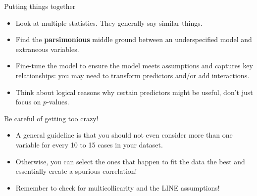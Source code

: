 \documentclass{beamer}\usepackage[]{graphicx}\usepackage[]{color}
\newenvironment{knitrout}{}{} %
\begin{document}
\begin{darkframes}
\begin{frame}[fragile]
      \vspace{-1in}

\begin{knitrout}


\end{knitrout}
    \end{frame}

    \begin{frame}{Putting things together}
      \begin{itemize}[<+->]
        \item Look at multiple statistics. They generally say similar things.
        \item Find the \textbf{parsimonious} middle ground between an underspecified model and extraneous variables.
        \item Fine-tune the model to ensure the model meets assumptions and captures key relationships: you may need to transform predictors and/or add interactions.
        \item Think about logical reasons why certain predictors might be useful, don't just focus on $p$-values.
      \end{itemize} 
    \end{frame}


    \begin{frame}{Be careful of getting too crazy!}
      \begin{itemize}[<+->]
        \item A general guideline is that you should not even consider more than one variable for every 10 to 15 cases in your dataset. 
        \item Otherwise, you can select the ones that happen to fit the data the best and essentially create a spurious correlation!
        \item Remember to check for multicolliearity and the LINE assumptions!
      \end{itemize} 
    \end{frame}
  \end{darkframes}
\end{document}
